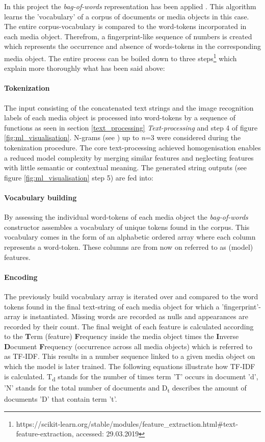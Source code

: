 In this project the \textit{bag-of-words} representation has been applied \parencite{Joulin2016}. This algorithm learns the 'vocabulary' of a corpus of documents or media objects in this case. The entire corpus-vocabulary is compared to the word-tokens incorporated in each media object. Therefrom, a fingerprint-like sequence of numbers is created which represents the occurrence and absence of words-tokens in the corresponding media object. The entire process can be boiled down to three steps\footnote{https://scikit-learn.org/stable/modules/feature\_extraction.html\#text-feature-extraction, accessed: 29.03.2019} which explain more thoroughly what has been said above:

\paragraph*{Tokenization} The input consisting of the concatenated text strings and the image recognition labels of each media object is processed into word-tokens by a sequence of functions as seen in section \ref{text_processing} \textit{Text-processing} and step 4 of figure \ref{fig:ml_visualisation}. N-grams (see ) up to \textit{n}=3 were considered during the tokenization procedure. The core text-processing achieved homogenisation enables a reduced model complexity by merging similar features and neglecting features with little semantic or contextual meaning. The generated string outputs (see figure \ref{fig:ml_visualisation} step 5) are fed into:

\paragraph*{Vocabulary building} By assessing the individual word-tokens of each media object the \textit{bag-of-words} constructor assembles a vocabulary of unique tokens found in the corpus. This vocabulary comes in the form of an alphabetic ordered array where each column represents a word-token. These columns are from now on referred to as (model) features.

\paragraph*{Encoding} The previously build vocabulary array is iterated over and compared to the word tokens found in the final text-string of each media object for which a 'fingerprint'-array is instantiated. Missing words are recorded as nulls and appearances are recorded by their count. The final weight of each feature is calculated according to the \textbf{T}erm (feature) \textbf{F}requency inside the media object times the \textbf{I}nverse  \textbf{D}ocument  \textbf{F}requency (occurrence across all media objects) which is referred to as TF-IDF. This results in a number sequence linked to a given media object on which the model is later trained. The following equations illustrate how TF-IDF is calculated. T\textsubscript{d} stands for the number of times term 'T' occurs in document 'd', 'N' stands for the total number of documents and D\textsubscript{t} describes the amount of documents 'D' that contain term 't'.

